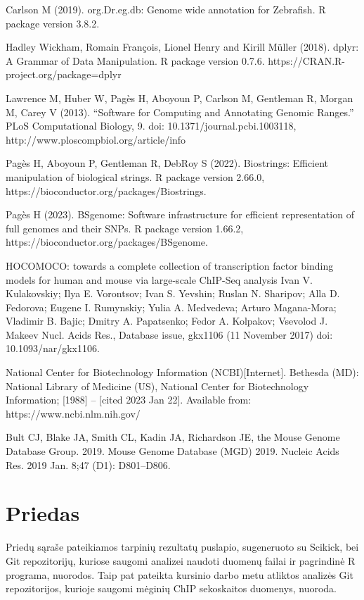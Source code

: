 \documentclass[12pt]{article}
\begin{document}
\begin{thebibliography}{99}
 Carlson M (2019). org.Dr.eg.db: Genome wide annotation for
Zebrafish. R package version 3.8.2.

 Hadley Wickham, Romain François, Lionel Henry and Kirill Müller
(2018). dplyr: A Grammar of Data Manipulation. R package version 0.7.6.
https://CRAN.R-project.org/package=dplyr

 Lawrence M, Huber W, Pagès H, Aboyoun P, Carlson M,
Gentleman R, Morgan M, Carey V (2013). “Software for Computing and Annotating
Genomic Ranges.” PLoS Computational Biology, 9.
doi: 10.1371/journal.pcbi.1003118,
http://www.ploscompbiol.org/article/info%

 Pagès H, Aboyoun P, Gentleman R, DebRoy S (2022).
Biostrings: Efficient manipulation of biological strings. R package version
2.66.0, https://bioconductor.org/packages/Biostrings.

 Pagès H (2023). BSgenome: Software infrastructure for
efficient representation of full genomes and their SNPs. R package version
1.66.2, https://bioconductor.org/packages/BSgenome.

 HOCOMOCO: towards a complete collection of transcription
factor binding models for human and mouse via large-scale ChIP-Seq analysis
Ivan V. Kulakovskiy; Ilya E. Vorontsov; Ivan S. Yevshin; Ruslan N. Sharipov;
Alla D. Fedorova; Eugene I. Rumynskiy; Yulia A. Medvedeva; Arturo Magana-Mora;
Vladimir B. Bajic; Dmitry A. Papatsenko; Fedor A. Kolpakov; Vsevolod J. Makeev
Nucl. Acids Res., Database issue, gkx1106 (11 November 2017)
doi: 10.1093/nar/gkx1106.

 National Center for Biotechnology Information (NCBI)[Internet].
Bethesda (MD): National Library of Medicine (US), National Center for
Biotechnology Information; [1988] – [cited 2023 Jan 22]. Available from:
https://www.ncbi.nlm.nih.gov/

 Bult CJ, Blake JA, Smith CL, Kadin JA, Richardson JE, the
Mouse Genome Database Group. 2019. Mouse Genome Database (MGD) 2019.
Nucleic Acids Res. 2019 Jan. 8;47 (D1): D801–D806.
\end{thebibliography}

\newpage


\section{Priedas} \label{Priedas}
Priedų sąraše pateikiamos tarpinių rezultatų puslapio, sugeneruoto su Scikick,
bei Git re\-po\-zi\-to\-ri\-jų, kuriose saugomi analizei naudoti duomenų
failai ir pagrindinė R programa, nuorodos. Taip pat pateikta kursinio darbo metu
atliktos analizės Git repozitorijos, kurioje saugomi mėginių ChIP sekoskaitos
duomenys, nuoroda.
\end{document}
